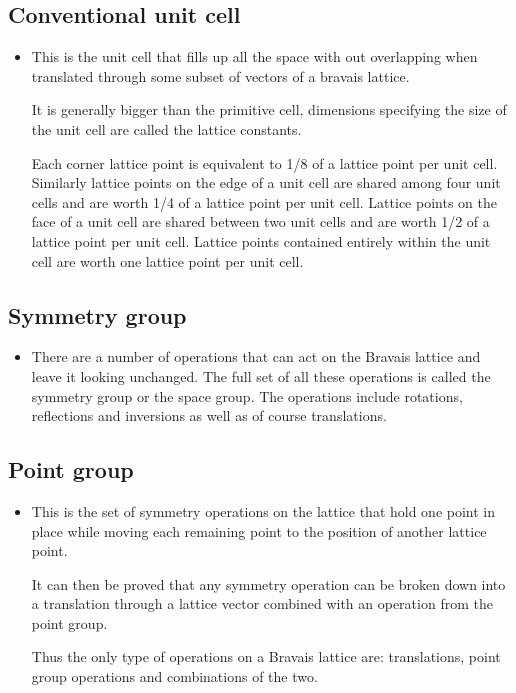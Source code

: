 \documentclass[11pt]{article}
\numberwithin{equation}{section}
\begin{document}
\subsection{Conventional unit cell}
\begin{itemize}
    \item This is the unit cell that fills up all the space with out overlapping when translated through some subset of vectors of a bravais lattice.

It is generally bigger than the primitive cell, dimensions specifying the size of the unit cell are called the lattice constants. 

Each corner lattice point is equivalent to 1/8 of a lattice point per unit cell. Similarly lattice points on the edge of a unit cell are shared among four unit cells and are worth 1/4 of a lattice point per unit cell. Lattice points on the face of a unit cell are shared between two unit cells and are worth 1/2 of a lattice point per unit cell. Lattice points contained entirely within the unit cell are worth one lattice point per unit cell.
\end{itemize}


\subsection{Symmetry group}
\begin{itemize}
    \item There are a number of operations that can act on the Bravais lattice and leave it looking unchanged. The full set of all these operations is called the symmetry group or the space group. The operations include rotations, reflections and inversions as well as of course translations. 
\end{itemize}

\subsection{Point group}
\begin{itemize}
    \item This is the set of symmetry operations on the lattice that hold one point in place while moving each remaining point to the position of another lattice point. 

It can then be proved that any symmetry operation can be broken down into a translation through a lattice vector combined with an operation from the point group. 

Thus the only type of operations on a Bravais lattice are: translations, point group operations and combinations of the two. 
\end{itemize}
\end{document}
